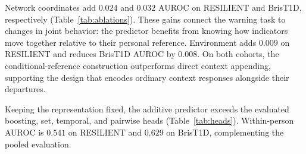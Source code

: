 Network coordinates add $0.024$ and $0.032$ AUROC on RESILIENT and BrisT1D, respectively (Table~\ref{tab:ablations}). These gains connect the warning task to changes in joint behavior: the predictor benefits from knowing how indicators move together relative to their personal reference. Environment adds $0.009$ on RESILIENT and reduces BrisT1D AUROC by $0.008$. On both cohorts, the conditional-reference construction outperforms direct context appending, supporting the design that encodes ordinary context responses alongside their departures.

\begin{table}[H]
\centering
\caption{Risk heads on the shared HNE representation.}
\label{tab:heads}
\end{table}

Keeping the representation fixed, the additive predictor exceeds the evaluated boosting, set, temporal, and pairwise heads (Table~\ref{tab:heads}). Within-person AUROC is $0.541$ on RESILIENT and $0.629$ on BrisT1D, complementing the pooled evaluation.
